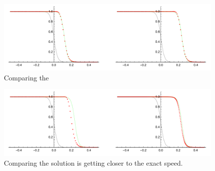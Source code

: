 \documentclass[../thesis.tex]{subfiles}
\begin{document}
\graphicspath{ {./figures/} }
\begin{figure}[H]
	\centering
	\includegraphics[width=\textwidth]{travel100.pdf}
	\caption{Comparing the}
	\label{fig:travel}
\end{figure}

\begin{figure}[H]
	\centering
	\includegraphics[width=\textwidth]{traveliter}
	\caption{Comparing the solution is getting closer to the exact speed.}
	\label{fig:travel_iter}
\end{figure}
\end{document}
